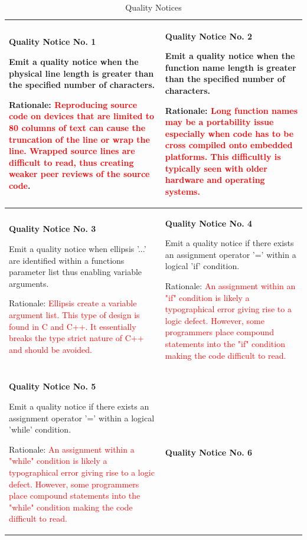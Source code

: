 {\footnotesize\sffamily\centering
  \begin{longtable}{||p{}|p{}||}
  \caption{Quality Notices}\\
    \hline\hline
    \hline\hline
    \endhead
    \hline\hline
    \endfoot
    \textbf{Quality Notice No. 1}

Emit a quality notice when the physical line length is greater than the specified number of characters.

Rationale:  \textcolor{red}{Reproducing source code on devices that are limited to 80 columns of text can cause the truncation of the line or wrap the line.  Wrapped source lines are difficult to read, thus creating weaker peer reviews of the source code}.
& \textbf{Quality Notice No. 2}

Emit a quality notice when the function name length is greater than the specified number of characters.  

Rationale:  \textcolor{red}{Long function names may be a portability issue especially when code has to be cross compiled onto embedded platforms.  This difficultly is typically seen with older hardware and operating systems.}
    \\
    \hline \textbf{Quality Notice No. 3}
    
Emit a quality notice when ellipsis '...' are identified within a functions parameter list thus enabling variable arguments.  

Rationale:  \textcolor{red}{Ellipsis create a variable argument list.  This type of design is found in C and C++.  It essentially breaks the type strict nature of C++ and should be avoided.}
 & \textbf{Quality Notice No. 4}
 
Emit a quality notice if there exists an assignment
operator '=' within a logical 'if' condition.

Rationale:  \textcolor{red}{An assignment within an "if" condition is likely a typographical error giving rise to a logic defect.  However, some programmers place compound statements into the "if" condition making the code difficult to read.}
    \\
    \hline \textbf{Quality Notice No. 5}
    
Emit a quality notice if there exists an assignment
operator '=' within a logical 'while' condition.

Rationale:  \textcolor{red}{An assignment within a "while" condition is likely a typographical error giving rise to a logic defect.  However, some programmers place compound statements into the "while" condition making the code difficult to read.}
 & \textbf{Quality Notice No. 6}
 

\end{longtable}}
